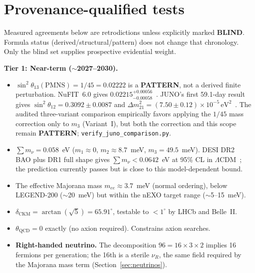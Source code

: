 \documentclass[12pt,a4paper]{article}
\theoremstyle{definition}
\begin{document}
\section{Provenance-qualified tests}
\label{sec:predictions}

Measured agreements below are retrodictions unless explicitly marked
\textbf{BLIND}.  Formula status (derived/structural/pattern) does not change
that chronology.  Only the blind set supplies prospective evidential weight.

\textbf{Tier 1: Near-term ($\sim$2027--2030).}
\begin{itemize}
\item $\sin^2\theta_{13}(\text{PMNS}) = 1/45 = 0.02222$ is a \textbf{PATTERN}, not a derived finite perturbation. NuFIT~6.0 gives $0.02215^{+0.00056}_{-0.00058}$~\cite{nufit6}. JUNO's first 59.1-day result gives $\sin^2\theta_{12}=0.3092\pm0.0087$ and $\Delta m^2_{21}=(7.50\pm0.12)\times10^{-5}\,\mathrm{eV}^2$~\cite{juno2025}.  The audited three-variant comparison empirically favors applying the $1/45$ mass correction only to $m_3$ (Variant~I), but both the correction and this scope remain \textbf{PATTERN}; \texttt{verify\_juno\_comparison.py}.
\item $\sum m_\nu = 0.058$~eV ($m_1 \approx 0$, $m_2 \approx 8.7$~meV, $m_3 = 49.5$~meV).  DESI DR2 BAO plus DR1 full shape gives $\sum m_\nu<0.0642$~eV at 95\% CL in $\Lambda$CDM~\cite{desinu2025}; the prediction currently passes but is close to this model-dependent bound.
\item The effective Majorana mass $m_{ee} \approx 3.7$~meV (normal ordering), below LEGEND-200 ($\sim$20~meV) but within the nEXO target range ($\sim$5--15~meV).
\item $\delta_{\text{CKM}} = \arctan(\sqrt{5}) = 65.91^\circ$, testable to $< 1^\circ$ by LHCb and Belle~II.
\item $\theta_{\text{QCD}} = 0$ exactly (no axion required). Constrains axion searches.
\item \textbf{Right-handed neutrino.} The decomposition $96 = 16 \times 3 \times 2$ implies 16 fermions per generation; the 16th is a sterile $\nu_R$, the same field required by the Majorana mass term (Section~\ref{sec:neutrinos}).
\end{itemize}
\end{document}
